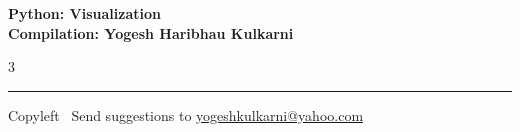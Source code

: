 \documentclass[8pt,landscape]{article}
\begin{document}
\footnotesize


\begin{center}
\Large{\textbf{Python: Visualization\\ Compilation: Yogesh Haribhau Kulkarni}}
\end{center}

\begin{multicols}{3}

\end{multicols}

\rule{\linewidth}{0.25pt}
\scriptsize
Copyleft \textcopyleft\  Send suggestions to
\href{http://www.yogeshkulkarni.com}{yogeshkulkarni@yahoo.com}
\end{document}
